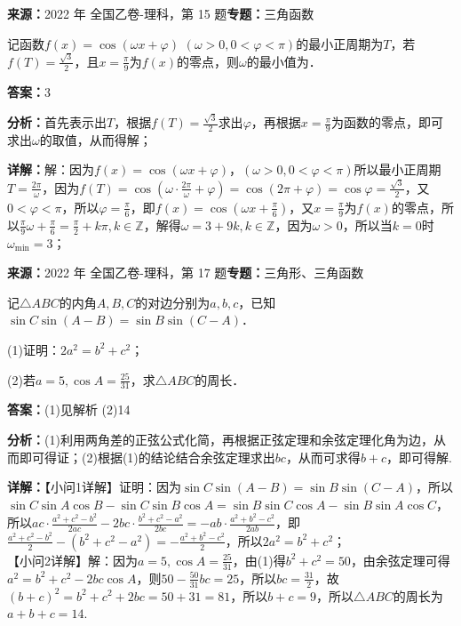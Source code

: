 \begin{question}[points=5]
\textbf{来源：}2022 年 全国乙卷-理科，第 15 题\quad \textbf{专题：}三角函数\par
记函数$f(x) = \cos(\omega x + \varphi)$ $(\omega > 0, 0 < \varphi < \pi)$的最小正周期为$T$，若$f(T) = \frac{\sqrt{3}}{2}$，且$x = \frac{\pi}{9}$为$f(x)$的零点，则$\omega$的最小值为．
\fillin[{$3$}]
\begin{solution}
\textbf{答案：}$3$

\textbf{分析：}首先表示出$T$，根据$f(T)=\frac{\sqrt{3}}{2}$求出$\varphi$，再根据$x=\frac{\pi}{9}$为函数的零点，即可求出$\omega$的取值，从而得解；

\textbf{详解：}解：因为$f(x)=\cos(\omega x+\varphi)$，$(\omega>0,0<\varphi<\pi)$所以最小正周期$T=\frac{2\pi}{\omega}$，因为$f(T)=\cos\left(\omega\cdot\frac{2\pi}{\omega}+\varphi\right)=\cos(2\pi+\varphi)=\cos\varphi=\frac{\sqrt{3}}{2}$，又$0<\varphi<\pi$，所以$\varphi=\frac{\pi}{6}$，即$f(x)=\cos\left(\omega x+\frac{\pi}{6}\right)$，又$x=\frac{\pi}{9}$为$f(x)$的零点，所以$\frac{\pi}{9}\omega+\frac{\pi}{6}=\frac{\pi}{2}+k\pi, k\in\mathbb{Z}$，解得$\omega=3+9k, k\in\mathbb{Z}$，因为$\omega>0$，所以当$k=0$时$\omega_{\min}=3$；
\end{solution}
\end{question}

\begin{question}[points=12]
\textbf{来源：}2022 年 全国乙卷-理科，第 17 题\quad \textbf{专题：}三角形、三角函数\par
记$\triangle ABC$的内角$A,B,C$的对边分别为$a,b,c$，已知$\sin C\sin(A-B) = \sin B\sin(C-A)$．

(1)证明：$2a^2 = b^2 + c^2$；

(2)若$a=5,\cos A = \frac{25}{31}$，求$\triangle ABC$的周长．
\begin{solution}
\textbf{答案：}(1)见解析 (2)14

\textbf{分析：}(1)利用两角差的正弦公式化简，再根据正弦定理和余弦定理化角为边，从而即可得证；(2)根据(1)的结论结合余弦定理求出$bc$，从而可求得$b+c$，即可得解.

\textbf{详解：}【小问1详解】证明：因为$\sin C\sin(A-B)=\sin B\sin(C-A)$，所以$\sin C\sin A\cos B - \sin C\sin B\cos A = \sin B\sin C\cos A - \sin B\sin A\cos C$，所以$ac\cdot\frac{a^2+c^2-b^2}{2ac} - 2bc\cdot\frac{b^2+c^2-a^2}{2bc} = -ab\cdot\frac{a^2+b^2-c^2}{2ab}$，即$\frac{a^2+c^2-b^2}{2} - (b^2+c^2-a^2) = -\frac{a^2+b^2-c^2}{2}$，所以$2a^2 = b^2 + c^2$；\\【小问2详解】解：因为$a=5,\cos A=\frac{25}{31}$，由(1)得$b^2+c^2=50$，由余弦定理可得$a^2 = b^2+c^2 - 2bc\cos A$，则$50 - \frac{50}{31}bc = 25$，所以$bc = \frac{31}{2}$，故$(b+c)^2 = b^2+c^2+2bc = 50+31=81$，所以$b+c=9$，所以$\triangle ABC$的周长为$a+b+c=14$.
\end{solution}
\end{question}

